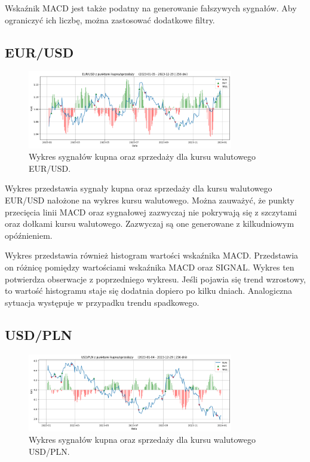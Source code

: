 \documentclass[12pt, a4paper]{article}
\begin{document}
Wskaźnik MACD jest także podatny na generowanie fałszywych sygnałów. Aby ograniczyć
ich liczbę, można zastosować dodatkowe filtry.

\subsection{EUR/USD}

\begin{figure}[ht]
    \centering
    \includegraphics[width=0.8\textwidth]{eur_usd_value_buy_sell.png}
    \caption{Wykres sygnałów kupna oraz sprzedaży dla kursu walutowego EUR/USD.}
    \label{fig:eur_usd_value_buy_sell}
\end{figure}

Wykres przedstawia sygnały kupna oraz sprzedaży dla kursu walutowego EUR/USD 
nałożone na wykres kursu walutowego. Można zauważyć, że punkty przecięcia linii MACD oraz sygnałowej
zazwyczaj nie pokrywają się z szczytami oraz dołkami kursu walutowego. Zazwyczaj są one generowane
z kilkudniowym opóźnieniem. 

Wykres przedstawia również histogram wartości wskaźnika MACD. Przedstawia on różnicę
pomiędzy wartościami wskaźnika MACD oraz SIGNAL. Wykres ten potwierdza obserwacje z poprzedniego
wykresu. Jeśli pojawia się trend wzrostowy, to wartość histogramu staje się dodatnia dopiero 
po kilku dniach. Analogiczna sytuacja występuje w przypadku trendu spadkowego.



\subsection{USD/PLN}

\begin{figure}[ht]
    \centering
    \includegraphics[width=0.8\textwidth]{usd_pln_value_buy_sell.png}
    \caption{Wykres sygnałów kupna oraz sprzedaży dla kursu walutowego USD/PLN.}
    \label{fig:usd_pln_value_buy_sell}
\end{figure}
\end{document}
